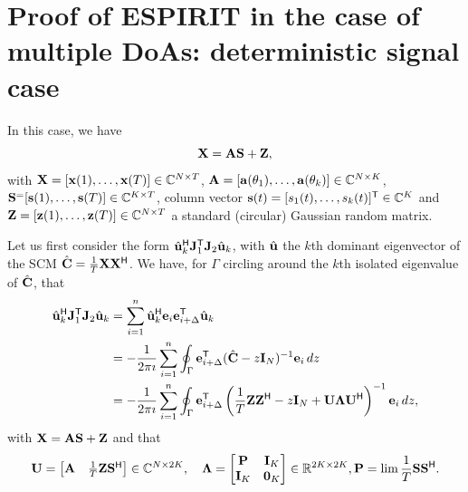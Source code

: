 \documentclass[11pt,a4paper]{article}
\begin{document}
\section{Proof of ESPIRIT in the case of multiple DoAs: deterministic signal case}

In this case, we have 
\begin{equation}
	{\mathbf{X}} = {\mathbf{A}} {\mathbf{S}} + {\mathbf{Z}},
\end{equation}
with ${\mathbf{X}} = [\mathbf{x}(1), \ldots, \mathbf{x}(T)] \in {\mathbb{C}}^{N \times T}$, ${\mathbf{A}} = [\mathbf{a}(\theta_1), \ldots, \mathbf{a}(\theta_k)] \in {\mathbb{C}}^{N \times K}$, ${\mathbf{S}}^ = [\mathbf{s}(1), \ldots, \mathbf{s}(T)] \in {\mathbb{C}}^{K \times T}$, column vector $\mathbf{s}(t) = [s_1(t), \ldots, s_k(t)]^{\sf T} \in {\mathbb{C}}^K$ and ${\mathbf{Z}} = [\mathbf{z}(1), \ldots, \mathbf{z}(T)] \in {\mathbb{C}}^{N \times T}$ a standard (circular) Gaussian random matrix.

Let us first consider the form $\hat {\mathbf{u}}_k^{\sf H} {\mathbf{J}}_1^{\sf T} {\mathbf{J}}_2 \hat {\mathbf{u}}_k$, with $\hat {\mathbf{u}}$ the $k$th dominant eigenvector of the SCM $\hat {{\mathbf{C}}} = \frac1T {\mathbf{X}} {\mathbf{X}}^{\sf H}$.
We have, for $\Gamma$ circling around the $k$th isolated eigenvalue of $\hat {{\mathbf{C}}}$, that
\begin{align*}
		\hat {\mathbf{u}}_k^{\sf H} {\mathbf{J}}_1^{\sf T} {\mathbf{J}}_2 \hat {\mathbf{u}}_k &= \sum_{i=1}^n \hat {\mathbf{u}}_k^{\sf H} \mathbf{e}_{i} \mathbf{e}_{i + \Delta}^{\sf T} \hat {\mathbf{u}}_k \\ 
		&= -\frac1{2 \pi \imath} \sum_{i=1}^n \oint_{\Gamma} \mathbf{e}_{i + \Delta}^{\sf T} ( \hat {{\mathbf{C}}} - z \mathbf{I}_N )^{-1} \mathbf{e}_{i}\,dz \\ 
		&= -\frac1{2 \pi \imath} \sum_{i=1}^n \oint_{\Gamma} \mathbf{e}_{i + \Delta}^{\sf T} \left( \frac1T {\mathbf{Z}} {\mathbf{Z}}^{\sf H} - z \mathbf{I}_N + {\mathbf{U}} \boldsymbol{\Lambda} {\mathbf{U}}^{\sf H} \right)^{-1} \mathbf{e}_{i}\,dz,
\end{align*}
with ${\mathbf{X}} = {\mathbf{A}} {\mathbf{S}} + {\mathbf{Z}}$ and that
\begin{equation}
	{\mathbf{U}} = \begin{bmatrix} {\mathbf{A}} & \frac1T {\mathbf{Z}} {\mathbf{S}} ^{\sf H} \end{bmatrix} \in {\mathbb{C}}^{N \times 2K}, \quad \boldsymbol{\Lambda} = \begin{bmatrix} {\mathbf{P}} & \mathbf{I}_K \\ \mathbf{I}_K & \mathbf{0}_K \end{bmatrix} \in {\mathbb{R}}^{2K \times 2K}, {\mathbf{P}} = \lim \frac{1}{T}{\mathbf{S}} {\mathbf{S}}^ {\sf H}.
\end{equation}
\end{document}
